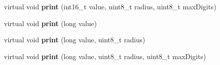 \begin{DoxyCompactItemize}
\item 
virtual void {\bfseries print} (int16\+\_\+t value, uint8\+\_\+t radius, uint8\+\_\+t max\+Digits)\hypertarget{class_l_k_m1638_board_aa272bb1dbb3efa68775183dce20900eb}{}\label{class_l_k_m1638_board_aa272bb1dbb3efa68775183dce20900eb}

\item 
virtual void {\bfseries print} (long value)\hypertarget{class_l_k_m1638_board_a15473b5559176286ee1f91e157725c55}{}\label{class_l_k_m1638_board_a15473b5559176286ee1f91e157725c55}

\item 
virtual void {\bfseries print} (long value, uint8\+\_\+t radius)\hypertarget{class_l_k_m1638_board_abd76f4879932dcafed65972c2ccefddb}{}\label{class_l_k_m1638_board_abd76f4879932dcafed65972c2ccefddb}

\item 
virtual void {\bfseries print} (long value, uint8\+\_\+t radius, uint8\+\_\+t max\+Digits)\hypertarget{class_l_k_m1638_board_acf4c5b99e65c269e9871ac1cf96b2c24}{}\label{class_l_k_m1638_board_acf4c5b99e65c269e9871ac1cf96b2c24}

\end{DoxyCompactItemize}
